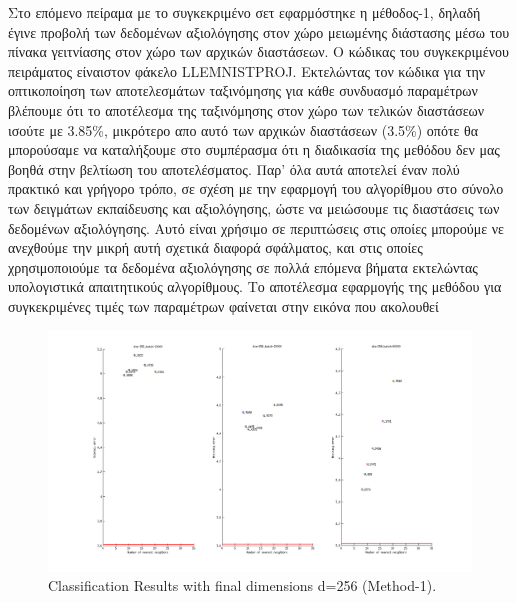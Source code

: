 Στο επόμενο πείραμα με το συγκεκριμένο σετ εφαρμόστηκε η μέθοδος-1, δηλαδή έγινε προβολή των δεδομένων αξιολόγησης στον χώρο μειωμένης διάστασης μέσω του πίνακα γειτνίασης στον χώρο των αρχικών διαστάσεων. Ο κώδικας του συγκεκριμένου πειράματος είναιστον φάκελο \textlatin{LLE\textunderscore MNIST\textunderscore PROJ}. Εκτελώντας τον κώδικα για την οπτικοποίηση των αποτελεσμάτων ταξινόμησης για κάθε συνδυασμό παραμέτρων βλέπουμε ότι το αποτέλεσμα της ταξινόμησης στον χώρο των τελικών διαστάσεων ισούτε με 3.85\%, μικρότερο απο αυτό των αρχικών διαστάσεων (3.5\%) οπότε θα μπορούσαμε να καταλήξουμε στο συμπέρασμα ότι η διαδικασία της μεθόδου δεν μας βοηθά στην βελτίωση του αποτελέσματος. Παρ' όλα αυτά αποτελεί έναν πολύ πρακτικό και γρήγορο τρόπο, σε σχέση με την εφαρμογή του αλγορίθμου στο σύνολο των δειγμάτων εκπαίδευσης και αξιολόγησης, ώστε να μειώσουμε τις διαστάσεις των δεδομένων αξιολόγησης. Αυτό είναι χρήσιμο σε περιπτώσεις στις οποίες μπορούμε νε ανεχθούμε την μικρή αυτή σχετικά διαφορά σφάλματος, και στις οποίες χρησιμοποιούμε τα δεδομένα αξιολόγησης σε πολλά επόμενα βήματα εκτελώντας υπολογιστικά απαιτητικούς αλγορίθμους. Το αποτέλεσμα εφαρμογής της μεθόδου για συγκεκριμένες τιμές των παραμέτρων φαίνεται στην εικόνα που ακολουθεί
\newpage
\begin{figure}[t!]
\centering
\includegraphics[width=\textwidth]{figs/11.png}
\newline
\caption{ \textlatin{Classification Results with final dimensions d=256 (Method-1)}.} 
\end{figure}

